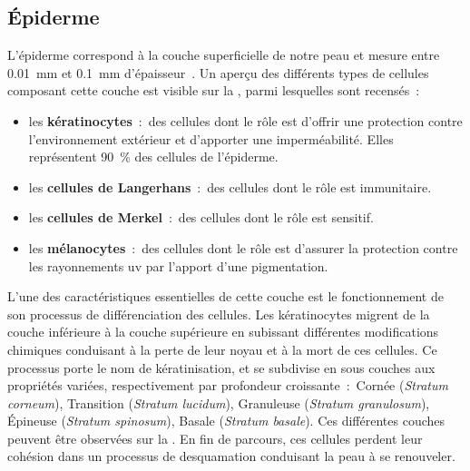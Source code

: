 \subsection{Épiderme}
L’épiderme correspond à la couche superficielle de notre peau et mesure entre \SI{0,01}{\milli\metre} et \SI{0,1}{\milli\metre} d’épaisseur~\cite{Sandby-Moller2003}. Un aperçu des différents types de cellules composant cette couche est visible sur la , parmi lesquelles sont recensés~:
\begin{itemize}
    \item les \textbf{kératinocytes}~:~des cellules dont le rôle est d'offrir une protection contre l'environnement extérieur et d'apporter une imperméabilité. Elles représentent 90~\% des cellules de l'épiderme.
    \item les \textbf{cellules de Langerhans}~:~des cellules dont le rôle est immunitaire.
    \item les \textbf{cellules de Merkel}~:~des cellules dont le rôle est sensitif.
    \item les \textbf{mélanocytes}~:~des cellules dont le rôle est d'assurer la protection contre les rayonnements \gls{uv} par l'apport d'une pigmentation.
\end{itemize}\par

L'une des caractéristiques essentielles de cette couche est le fonctionnement de son processus de différenciation des cellules. Les kératinocytes migrent de la couche inférieure à la couche supérieure en subissant différentes modifications chimiques conduisant à la perte de leur noyau et à la mort de ces cellules. Ce processus porte le nom de kératinisation, et se subdivise en sous couches aux propriétés variées, respectivement par profondeur croissante~:~Cornée (\textit{Stratum corneum}), Transition (\textit{Stratum lucidum}), Granuleuse (\textit{Stratum granulosum}), Épineuse (\textit{Stratum spinosum}), Basale (\textit{Stratum basale}). Ces différentes couches peuvent être observées sur la . En fin de parcours, ces cellules perdent leur cohésion dans un processus de desquamation conduisant la peau à se renouveler.\par


